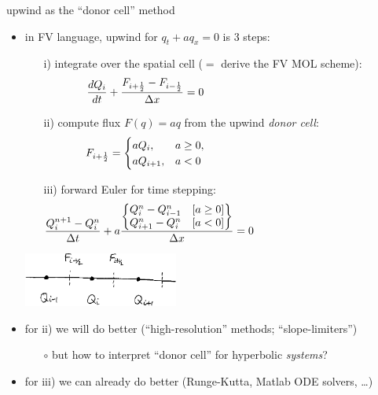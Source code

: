\documentclass[10pt,dvipsnames,usepdftitle=false,
hyperref={pdftitle = {Finite volume methods},
    pdfauthor = {Ed Bueler}}]{beamer}
\newcommand{\Fiphalf}{{F_{i+\frac{1}{2}}}}
\newcommand{\Fimhalf}{{F_{i-\frac{1}{2}}}}
\begin{document}
\begin{frame}{upwind as the ``donor cell'' method}

\begin{itemize}
\item in FV language, upwind for $q_t + a q_x = 0$ is 3 steps:
    \begin{itemize}
    \item[i)] integrate over the spatial cell ($=$ derive the FV MOL scheme):
        $$\frac{dQ_i}{dt} + \frac{\Fiphalf-\Fimhalf}{\Delta x} = 0 \hspace{50mm}$$
    \item[ii)] compute flux $F(q)=aq$ from the upwind \emph{donor cell}:
        $$\Fiphalf = \begin{cases} a Q_{i}, & a \ge 0, \\
                                   a Q_{i+1}, & a < 0 \end{cases} \hspace{50mm}$$
    \item[iii)] forward Euler for time stepping:
        $$\frac{Q_i^{n+1} - Q_i^n}{\Delta t} + a \frac{\begin{Bmatrix} Q^n_{i}-Q^n_{i-1} \quad [a\ge 0] \\ Q^n_{i+1}-Q^n_{i} \quad [a<0] \end{Bmatrix}}{\Delta x} = 0 \hspace{50mm}$$
    \end{itemize}

\vspace{-30mm}

\hfill \includegraphics[width=0.4\textwidth]{figs/cellfluxsketch}

\vspace{12mm}
\item for ii) we will do better {\small (``high-resolution'' methods; ``slope-limiters'')}
    \begin{itemize}
    \item[$\circ$] but how to interpret ``donor cell'' for hyperbolic \emph{systems}?
    \end{itemize}
\item for iii) we can already do better {\small (Runge-Kutta, Matlab ODE solvers, \dots)}
\end{itemize}
\end{frame}
\end{document}
